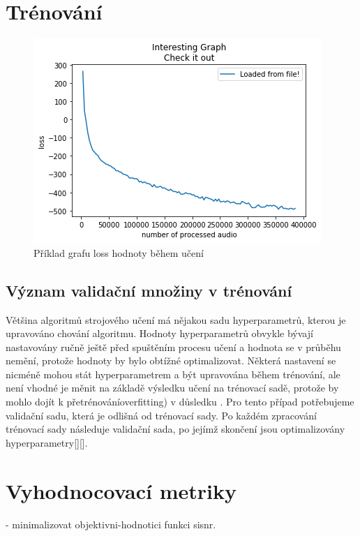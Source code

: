 \section{Trénování}
\begin{figure}[H]
    \centering
    \includegraphics[scale=0.55]{obrazky-figures/some-loss.png}
    \caption{\label{fig:somelossTODO}Příklad grafu loss hodnoty během učení}
\end{figure}

\subsection{Význam validační množiny v trénování}
Většina algoritmů strojového učení má nějakou sadu hyperparametrů, kterou je upravováno chování algoritmu. Hodnoty hyperparametrů obvykle bývají nastavovány ručně ještě před spuštěním procesu učení a hodnota se v průběhu nemění, protože hodnoty by bylo obtížné optimalizovat. 
Některá nastavení se nicméně mohou stát hyperparametrem a být upravována během trénování, ale není vhodné je měnit na základě výsledku učení na trénovací sadě, protože by mohlo dojít k přetrénováníoverfitting) v důsledku . Pro tento případ potřebujeme validační sadu, která je odlišná od trénovací sady.
Po každém zpracování trénovací sady následuje validační sada, po jejímž skončení jsou optimalizovány hyperparametry[][].


\section{Vyhodnocovací metriky}
- minimalizovat objektivni-hodnotici funkci sisnr.
